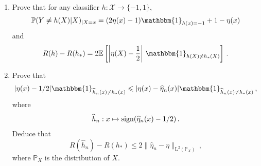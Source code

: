 \documentclass[a4paper,10pt,fleqn]{article}
\newcommand{\eqsp}{\,}
\newcommand{\bP}{\mathbb{P}}
\newcommand{\xset}{\ensuremath{\mathsf{X}}}
\newcommand{\1}{\ensuremath{\mathbbm{1}}}
\newcommand{\bE}{\mathbb{E}}
\begin{document}
\begin{enumerate}
\item Prove that for any classifier $h:\mathcal{X}\to \{-1,1\}$,
$$
\bP(Y\neq h(X)|X)_{|X=x} = (2\eta(x)-1)\1_{h(x)=-1}+1-\eta(x)
$$
and
$$
R(h)-R(h_{*})=2\bE \left[\left|\eta(X)-\frac{1}{2}\right|\eqsp\1_{h(X)\neq h_*(X)}\right]\eqsp.
$$
%
%
\item Prove that 
$$
|\eta(x)-1/2|\1_{\widehat h_n(x)\neq h_{*}(x)}\leqslant |\eta(x)-\widehat \eta_n(x)|\1_{\widehat h_n(x)\neq h_{*}(x)}\eqsp,
$$
where
$$
\widehat h_n:x \mapsto{\rm sign}(\widehat \eta_n(x)-1/2)\eqsp.
$$
Deduce that 
$$
R(\widehat h_n)-R(h_*)\leqslant 2\|\widehat \eta_n-\eta\|_{\mathrm{L}^2(\bP_X)}\eqsp,
$$
where $\bP_X$ is the distribution of $X$.
%

\end{enumerate}
\end{document}

